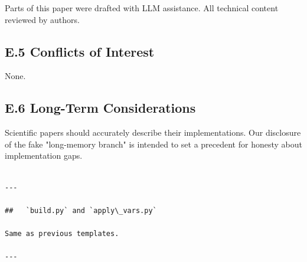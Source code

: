 Parts of this paper were drafted with LLM assistance. All technical content 
reviewed by authors.

\subsection{E.5 Conflicts of Interest}

None.

\subsection{E.6 Long-Term Considerations}

Scientific papers should accurately describe their implementations. Our 
disclosure of the fake "long-memory branch" is intended to set a precedent 
for honesty about implementation gaps.
\begin{lstlisting}

---

##   `build.py` and `apply\_vars.py`

Same as previous templates.

---
\end{lstlisting}

